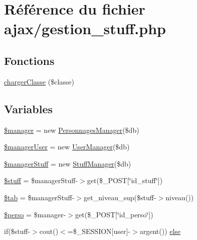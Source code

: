 \hypertarget{gestion__stuff_8php}{}\section{Référence du fichier ajax/gestion\+\_\+stuff.php}
\label{gestion__stuff_8php}
\subsection*{Fonctions}
\begin{DoxyCompactItemize}
\item 
\mbox{\hyperlink{gestion__stuff_8php_a6bdbbd60a21fa5e8c1db3f7596a47013}{charger\+Classe}} (\$classe)
\end{DoxyCompactItemize}
\subsection*{Variables}
\begin{DoxyCompactItemize}
\item 
\mbox{\hyperlink{gestion__stuff_8php_a4621b1cd69b1417c9fb966c825299de1}{\$manager}} = new \mbox{\hyperlink{class_personnages_manager}{Personnages\+Manager}}(\$db)
\item 
\mbox{\hyperlink{gestion__stuff_8php_a78fbdfc06cdd1bc6afd9b0f2a26eeb5c}{\$manager\+User}} = new \mbox{\hyperlink{class_user_manager}{User\+Manager}}(\$db)
\item 
\mbox{\hyperlink{gestion__stuff_8php_ad4b5aa6a9d6e4cad8f747fef1cf199cb}{\$manager\+Stuff}} = new \mbox{\hyperlink{class_stuff_manager}{Stuff\+Manager}}(\$db)
\item 
\mbox{\hyperlink{gestion__stuff_8php_a76bfc00f1cc8b5d6c8ee34bc94d5f3e7}{\$stuff}} = \$manager\+Stuff-\/$>$get(\$\+\_\+\+P\+O\+ST\mbox{[}\char`\"{}id\+\_\+stuff\char`\"{}\mbox{]})
\item 
\mbox{\hyperlink{gestion__stuff_8php_aab50d97eed7abd779caf1f2de48c1c5f}{\$tab}} = \$manager\+Stuff-\/$>$get\+\_\+niveau\+\_\+sup(\$stuff-\/$>$niveau())
\item 
\mbox{\hyperlink{gestion__stuff_8php_a648bcc9981df7cceb4b931a80064a6c5}{\$perso}} = \$manager-\/$>$get(\$\+\_\+\+P\+O\+ST\mbox{[}\char`\"{}id\+\_\+perso\char`\"{}\mbox{]})
\item 
if(\$stuff-\/$>$cout()$<$=\$\+\_\+\+S\+E\+S\+S\+I\+ON\mbox{[}\textquotesingle{}user\textquotesingle{}\mbox{]}-\/$>$argent()) \mbox{\hyperlink{gestion__stuff_8php_abfd6cdf9d11bd39db0c3babaafd3015e}{else}}
\end{DoxyCompactItemize}



